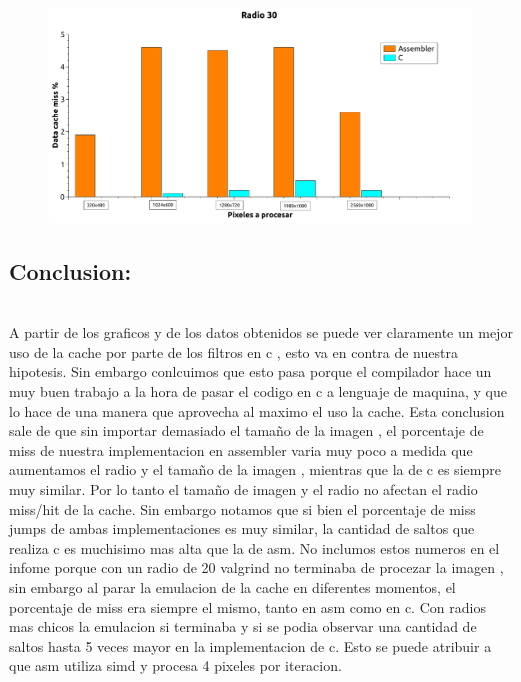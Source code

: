 \begin{figure}[H]
\begin{center}
  \includegraphics[width=\linewidth]{cache/Radio 30.pdf}
\end{center}
\end{figure}

\subsection{Conclusion:} \\

A partir de los graficos y de los datos obtenidos se puede ver claramente un mejor uso de la cache por parte de los filtros en c , esto va en contra de nuestra hipotesis. Sin embargo conlcuimos que esto pasa porque el compilador hace un muy buen trabajo a la hora de pasar el codigo en c a lenguaje de maquina, y que lo hace de una manera que aprovecha al maximo el uso la cache. Esta conclusion sale de que sin importar demasiado el tamaño de la imagen , el porcentaje de miss de nuestra implementacion en assembler varia muy poco a medida que aumentamos el radio y el tamaño de la imagen , mientras que la de c es siempre muy similar. Por lo tanto el tamaño de imagen y el radio no afectan el radio miss/hit de la cache. Sin embargo notamos que si bien el porcentaje de miss jumps de ambas implementaciones es muy similar, la cantidad de saltos que realiza c es muchisimo mas alta que la de asm. No inclumos estos numeros en el infome porque con un radio de 20 valgrind no terminaba de procezar la imagen , sin embargo al parar la emulacion de la cache en diferentes momentos, el porcentaje de miss era siempre el mismo, tanto en asm como en c. Con radios mas chicos la emulacion si terminaba y si se podia observar una cantidad de saltos hasta 5 veces mayor en la implementacion de c. Esto se puede atribuir a que asm utiliza simd y procesa 4 pixeles por iteracion.

